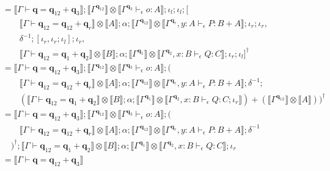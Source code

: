 \documentclass[acmsmall,screen,review]{acmart}
\newcommand{\mb}[1]{\ensuremath{\mathbf{#1}}}
\newcommand{\qsp}[4]{#1 \vdash #2 = #3 + #4}
\newcommand{\hasty}[4]{#1 \vdash_{#2} #3: {#4}}
\newcommand{\dnt}[1]{\llbracket{#1}\rrbracket}
\begin{document}
\begin{itemize}
\begin{align*}
  &= \dnt{\qsp{\Gamma}{\mb{q}}{\mb{q}_{12}}{\mb{q}_3}}
      ; \dnt{\Gamma^{\mb{q}_{12}}} 
        \otimes \dnt{\hasty{\Gamma^{\mb{q}_3}}{\epsilon}{o}{A}}
      ; \iota_l ; \iota_l
      ; [\\ & \qquad
      \dnt{\qsp{\Gamma}{\mb{q}_{12}}{\mb{q}_{12}}{\mb{q}_r}} \otimes \dnt{A}
      ; \alpha
      ; \dnt{\Gamma^{\mb{q}_{12}}} \otimes \dnt{\hasty{\Gamma^{\mb{q}_r}, y : A}{\epsilon}
            {P}{B + A}}
      ; \iota_r ; \iota_r
      ,
      \\ & \qquad
      \delta^{-1} ; [\iota_r, \iota_r ; \iota_l] ; \iota_r, \\ & \qquad
      \dnt{\qsp{\Gamma}{\mb{q}_{12}}{\mb{q}_1}{\mb{q}_2}} \otimes \dnt{B}
      ; \alpha
      ; \dnt{\Gamma^{\mb{q}_1}} \otimes \dnt{\hasty{\Gamma^{\mb{q}_2}, x : B}{\epsilon}{Q}{C}}
      ; \iota_r ; \iota_l
    ]^\dagger \\
  &= \dnt{\qsp{\Gamma}{\mb{q}}{\mb{q}_{12}}{\mb{q}_3}}
      ; \dnt{\Gamma^{\mb{q}_{12}}} 
        \otimes \dnt{\hasty{\Gamma^{\mb{q}_3}}{\epsilon}{o}{A}}
      ; ( \\ & \qquad
        \dnt{\qsp{\Gamma}{\mb{q}_{12}}{\mb{q}_{12}}{\mb{q}_r}} \otimes \dnt{A}
        ; \alpha
        ; \dnt{\Gamma^{\mb{q}_{12}}} \otimes \dnt{\hasty{\Gamma^{\mb{q}_r}, y : A}{\epsilon}
              {P}{B + A}}
        ; \delta^{-1} ; 
        \\ & \qquad 
        ( 
          \dnt{\qsp{\Gamma}{\mb{q}_{12}}{\mb{q}_1}{\mb{q}_2}} \otimes \dnt{B}
          ; \alpha
          ; \dnt{\Gamma^{\mb{q}_1}} \otimes \dnt{\hasty{\Gamma^{\mb{q}_2}, x : B}{\epsilon}{Q}{C}
          ; \iota_r}
        ) + (\dnt{\Gamma^{\mb{q}_{12}}} \otimes \dnt{A})
      )^\dagger \\
  &= \dnt{\qsp{\Gamma}{\mb{q}}{\mb{q}_{12}}{\mb{q}_3}}
      ; \dnt{\Gamma^{\mb{q}_{12}}} 
        \otimes \dnt{\hasty{\Gamma^{\mb{q}_3}}{\epsilon}{o}{A}}
      ; ( \\ & \qquad
        \dnt{\qsp{\Gamma}{\mb{q}_{12}}{\mb{q}_{12}}{\mb{q}_r}} \otimes \dnt{A}
        ; \alpha
        ; \dnt{\Gamma^{\mb{q}_{12}}} \otimes \dnt{\hasty{\Gamma^{\mb{q}_r}, y : A}{\epsilon}
              {P}{B + A}}
        ; \delta^{-1}
        \\ & \quad 
      )^\dagger 
      ; \dnt{\qsp{\Gamma}{\mb{q}_{12}}{\mb{q}_1}{\mb{q}_2}} \otimes \dnt{B}
      ; \alpha
      ; \dnt{\Gamma^{\mb{q}_1}} \otimes \dnt{\hasty{\Gamma^{\mb{q}_2}, x : B}{\epsilon}{Q}{C}}
      ; \iota_r \\
  &= \dnt{\qsp{\Gamma}{\mb{q}}{\mb{q}_{12}}{\mb{q}_3}}

\end{align*}
\end{itemize}
\end{document}
